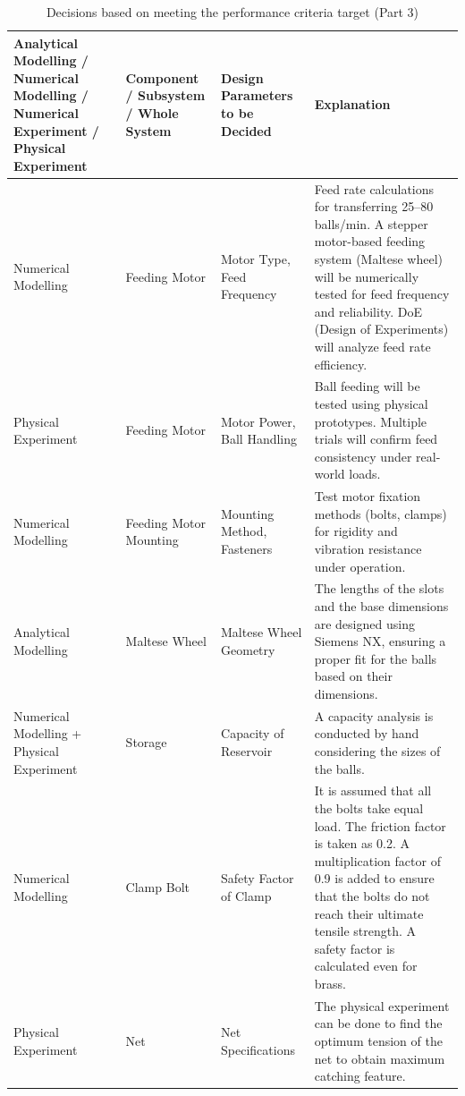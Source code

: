 \documentclass[12pt]{report}
\renewcommand{\arraystretch}{1.2} %
\begin{document}
\begin{table}[H]
\centering
\caption{Decisions based on meeting the performance criteria target (Part 3)}
\scriptsize %
\renewcommand{\arraystretch}{1.5}
\setlength{\tabcolsep}{4pt}
\begin{tabular}{|>{\raggedright\arraybackslash}p{4cm}|>{\raggedright\arraybackslash}p{2cm}|>{\raggedright\arraybackslash}p{3cm}|>{\raggedright\arraybackslash}p{7cm}|}
\hline
\textbf{Analytical Modelling / Numerical Modelling / Numerical Experiment / Physical Experiment} & \textbf{Component / Subsystem / Whole System} & \textbf{Design Parameters to be Decided} & \textbf{Explanation} \\ \hline
Numerical Modelling & Feeding Motor & Motor Type, Feed Frequency & Feed rate calculations for transferring 25–80 balls/min. A stepper motor-based feeding system (Maltese wheel) will be numerically tested for feed frequency and reliability. DoE (Design of Experiments) will analyze feed rate efficiency. \\ \hline
Physical Experiment & Feeding Motor & Motor Power, Ball Handling & Ball feeding will be tested using physical prototypes. Multiple trials will confirm feed consistency under real-world loads. \\ \hline
Numerical Modelling & Feeding Motor Mounting & Mounting Method, Fasteners & Test motor fixation methods (bolts, clamps) for rigidity and vibration resistance under operation. \\ \hline
Analytical Modelling & Maltese Wheel & Maltese Wheel Geometry & The lengths of the slots and the base dimensions are designed using Siemens NX, ensuring a proper fit for the balls based on their dimensions. \\ \hline
Numerical Modelling + Physical Experiment & Storage & Capacity of Reservoir & A capacity analysis is conducted by hand considering the sizes of the balls. \\ \hline
Numerical Modelling & Clamp Bolt & Safety Factor of Clamp & It is assumed that all the bolts take equal load. The friction factor is taken as 0.2. A multiplication factor of 0.9 is added to ensure that the bolts do not reach their ultimate tensile strength. A safety factor is calculated even for brass. \\ \hline
Physical Experiment & Net & Net Specifications & The physical experiment can be done to find the optimum tension of the net to obtain maximum catching feature. \\ \hline
\end{tabular}
\label{tab:performance_criteria}
\end{table}
\end{document}
